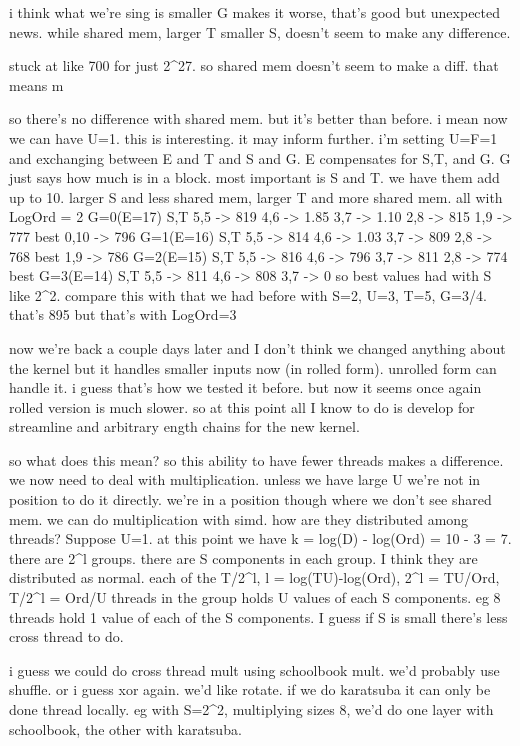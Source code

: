 i think what we're sing is smaller G makes it worse, that's good but unexpected news.
while shared mem, larger T smaller S, doesn't seem to make any difference.

stuck at like 700 for just 2^27.
so shared mem doesn't seem to make a diff.
that means m

so there's no difference with shared mem. but it's better than before. i mean now we can have U=1.
this is interesting. it may inform further.
i'm setting U=F=1 and exchanging between E and T and S and G.
E compensates for S,T, and G.
G just says how much is in a block. most important is S and T. we have them add up to 10. 
larger S and less shared mem, larger T and more shared mem. 
all with LogOrd = 2
G=0(E=17)
    S,T
    5,5 -> 819
    4,6 -> 1.85
    3,7 -> 1.10
    2,8 -> 815
    1,9 -> 777 best
    0,10 -> 796
G=1(E=16)
    S,T
    5,5 -> 814
    4,6 -> 1.03
    3,7 -> 809
    2,8 -> 768 best
    1,9 -> 786 
G=2(E=15)
    S,T
    5,5 -> 816
    4,6 -> 796
    3,7 -> 811
    2,8 -> 774 best
G=3(E=14)
    S,T
    5,5 -> 811
    4,6 -> 808
    3,7 -> 0
so best values had with S like 2^2.
compare this with that we had before with S=2, U=3, T=5, G=3/4. that's 895 but that's with LogOrd=3


now we're back a couple days later and I don't think we changed anything about the kernel but it handles smaller inputs now (in rolled form). unrolled form can handle it. i guess that's how we tested it before. 
but now it seems once again rolled version is much slower. 
so at this point all I know to do is develop for streamline and arbitrary ength chains for the new kernel.


so what does this mean?
so this ability to have fewer threads makes a difference.
we now need to deal with multiplication. unless we have large U we're not in position to do it directly.
we're in a position though where we don't see shared mem. we can do multiplication with simd.
how are they distributed among threads? Suppose U=1.
at this point we have k = log(D) - log(Ord) = 10 - 3 = 7.
there are 2^l groups. there are S components in each group. I think they are distributed as normal. each of the T/2^l, l = log(TU)-log(Ord), 2^l = TU/Ord, T/2^l = Ord/U threads in the group holds U values of each S components. eg 8 threads hold 1 value of each of the S components. I guess if S is small there's less cross thread to do. 

i guess we could do cross thread mult using schoolbook mult. we'd probably use shuffle. or i guess xor again. we'd like rotate.
if we do karatsuba it can only be done thread locally. eg with S=2^2, multiplying sizes 8, we'd do one layer with schoolbook, the other with karatsuba. 

